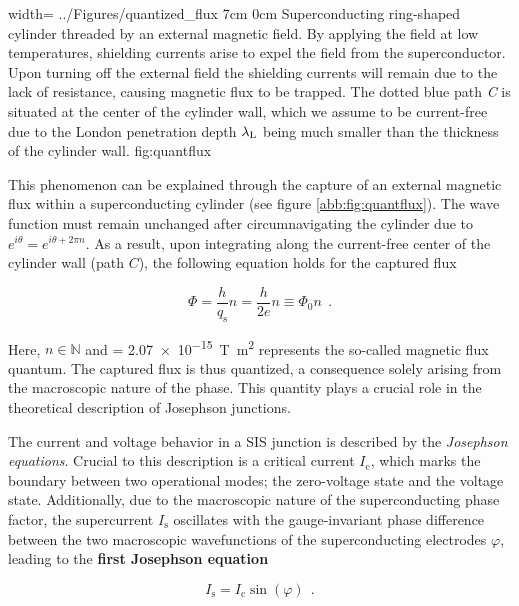 {width=\textwidth}
{../Figures/quantized_flux}
{7cm}
{0cm}
{Superconducting ring-shaped cylinder threaded by an external magnetic field. By applying the field at low temperatures, shielding currents arise to expel the field from the superconductor. Upon turning off the external field the shielding currents will remain due to the lack of resistance, causing magnetic flux to be trapped. The dotted blue path \textit{C} is situated at the center of the cylinder wall, which we assume to be current-free due to the London penetration depth $\lambda_{\rm L}$ being much smaller than the thickness of the cylinder wall.} 
{fig:quantflux}

This phenomenon can be explained through the capture of an external magnetic flux within a superconducting cylinder (see figure \ref{abb:fig:quantflux}). The wave function must remain unchanged after circumnavigating the cylinder due to $e^{i\theta} = e^{i\theta + 2\pi n}$. As a result, upon integrating along the current-free center of the cylinder wall (path $C$), the following equation holds for the captured flux \cite{Deaver1961}

\begin{equation}\label{fq}
\Phi = \frac{h}{q_\mathrm{s}}n = \frac{h}{2e}n \equiv \Phi_0n \ \ .
\end{equation}

Here, $n\in\mathbb{N}$ and \unit{\fq} = \qty{2.07e-15}{\tesla\metre\squared} \cite{CODATA2018} represents the so-called magnetic flux quantum. The captured flux is thus quantized, a consequence solely arising from the macroscopic nature of the phase. This quantity plays a crucial role in the theoretical description of Josephson junctions.


The current and voltage behavior in a SIS junction is described by the \textit{Josephson equations}. Crucial to this description is a critical current \textit{$I_\mathrm{c}$}, which marks the boundary between two operational modes; the zero-voltage state and the voltage state. Additionally, due to the macroscopic nature of the superconducting phase factor, the supercurrent $I_\mathrm{s}$ oscillates with the gauge-invariant phase difference between the two macroscopic wavefunctions of the superconducting electrodes $\varphi$, leading to the \textbf{first Josephson equation} \cite{Josephson1965}

\begin{equation}
\label{1.JE}
I_\mathrm{s} = I_\mathrm{c}\sin(\varphi) \ \ .
\end{equation}

